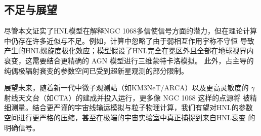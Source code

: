 \documentclass[UTF8]{ctexart}
\begin{document}
\subsection{不足与展望}

尽管本文证实了HNL模型在解释NGC 1068多信使信号方面的潜力，但在理论计算中仍存在许多近似与不足。例如，计算中忽略了由于弱相互作用宇称不守恒
导致产生的HNL螺旋度极化效应；模型假设了HNL完全在冕区外且全部在地球视界内衰变，这需要结合更精确的 AGN 模型进行三维蒙特卡洛模拟。
此外，占主导的纯偶极辐射衰变的参数空间已受到超新星观测的部分限制。

展望未来，随着新一代中微子观测站（如KM3NeT/ARCA）以及更高灵敏度的 $\gamma$ 射线天文台（如CTA）的建成并投入运行，更多像 NGC 1068 这样的点源将
被精细测量。结合更严谨的宇宙线输运模拟与粒子物理计算，我们有望对HNL的参数空间进行更严格的压缩，甚至在极端的宇宙实验室中真正捕捉到来自HNL衰变
的明确信号。




\newpage


\end{document}
